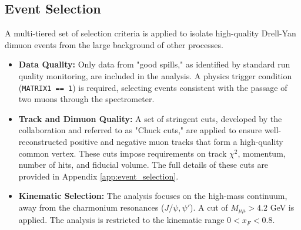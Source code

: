 \documentclass[11pt]{article}
\begin{document}
\subsection{Event Selection}
\label{sec:event_selection}
A multi-tiered set of selection criteria is applied to isolate high-quality Drell-Yan dimuon events from the large background of other processes.
\begin{itemize}
    \item \textbf{Data Quality:} Only data from "good spills," as identified by standard run quality monitoring, are included in the analysis. A physics trigger condition (\texttt{MATRIX1 == 1}) is required, selecting events consistent with the passage of two muons through the spectrometer.
    \item \textbf{Track and Dimuon Quality:} A set of stringent cuts, developed by the collaboration and referred to as "Chuck cuts," are applied to ensure well-reconstructed positive and negative muon tracks that form a high-quality common vertex. These cuts impose requirements on track $\chi^2$, momentum, number of hits, and fiducial volume. The full details of these cuts are provided in Appendix \ref{app:event_selection}.
    \item \textbf{Kinematic Selection:} The analysis focuses on the high-mass continuum, away from the charmonium resonances ($J/\psi, \psi'$). A cut of $M_{\mu\mu} > 4.2$ GeV is applied. The analysis is restricted to the kinematic range $0 < x_F < 0.8$.
\end{itemize}
\end{document}
